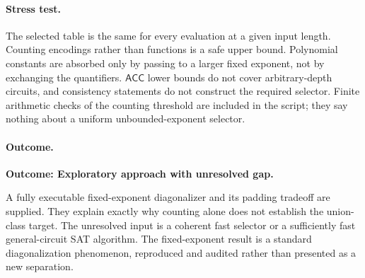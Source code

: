 \documentclass[11pt,a4paper]{article}
\numberwithin{equation}{section}
\begin{document}
\paragraph{Stress test.}
The selected table is the same for every evaluation at a given input length. Counting encodings rather than functions is a safe upper bound. Polynomial constants are absorbed only by passing to a larger fixed exponent, not by exchanging the quantifiers. $\mathsf{ACC}$ lower bounds do not cover arbitrary-depth circuits, and consistency statements do not construct the required selector. Finite arithmetic checks of the counting threshold are included in the script; they say nothing about a uniform unbounded-exponent selector.

\paragraph{Outcome.}
\textbf{Outcome: Exploratory approach with unresolved gap.}

A fully executable fixed-exponent diagonalizer and its padding tradeoff are supplied. They explain exactly why counting alone does not establish the union-class target. The unresolved input is a coherent fast selector or a sufficiently fast general-circuit SAT algorithm. The fixed-exponent result is a standard diagonalization phenomenon, reproduced and audited rather than presented as a new separation.

\end{document}
